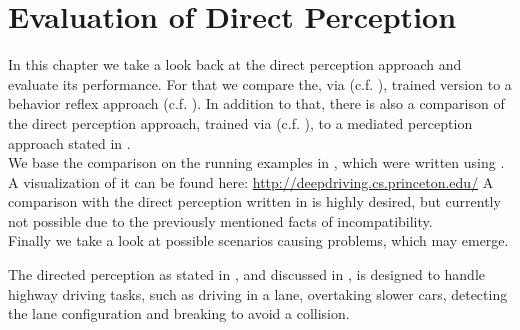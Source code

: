 \chapter{Evaluation of Direct Perception}

In this chapter we take a look back at the direct perception approach and evaluate its performance. For that we compare the, via \torcs (c.f. ), trained version to a behavior reflex approach (c.f. ). In addition to that, there is also a comparison of the direct perception approach, trained via \kitti (c.f. ), to a mediated perception approach stated in \cite{geiger20143d}.\\
We base the comparison on the running examples in \cite{DeepDriving}, which were written using \caffe. A visualization of it can be found here: \url{http://deepdriving.cs.princeton.edu/}
A comparison with the direct perception written in \cnnarch is highly desired, but currently not possible due to the previously mentioned facts of incompatibility.\\
Finally we take a look at possible scenarios causing problems, which may emerge. 

The directed perception as stated in \cite{chen2015deepdriving}, and discussed in , is designed to handle highway driving tasks, such as driving in a lane, overtaking slower cars, detecting the lane configuration and breaking to avoid a collision.

